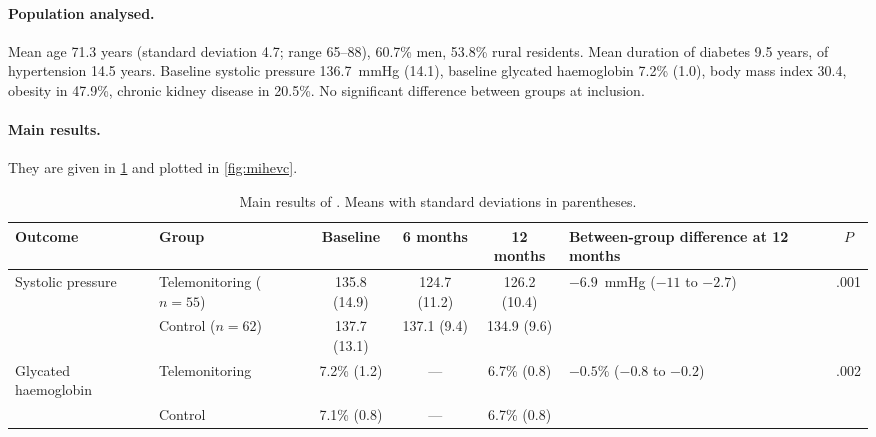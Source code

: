 \documentclass[12pt,a4paper,oneside]{report}
\begin{document}
\paragraph{Population analysed.} Mean age 71.3 years (standard deviation 4.7; range 65--88), 60.7\% men, 53.8\% rural residents. Mean duration of diabetes 9.5 years, of hypertension 14.5 years. Baseline systolic pressure 136.7~mmHg (14.1), baseline glycated haemoglobin 7.2\% (1.0), body mass index 30.4, obesity in 47.9\%, chronic kidney disease in 20.5\%. No significant difference between groups at inclusion.

\paragraph{Main results.} They are given in \cref{tab:mihevc-results} and plotted in \cref{fig:mihevc}.

\begin{table}[htbp]
\centering\footnotesize
\caption{Main results of \textcite{mihevc2025}. Means with standard deviations in parentheses.}\label{tab:mihevc-results}
\begin{tabularx}{\textwidth}{@{}>{\raggedright\arraybackslash}p{2.1cm} >{\raggedright\arraybackslash}p{2.1cm} c c c >{\raggedright\arraybackslash}p{2.6cm} c@{}}
\toprule
\textbf{Outcome} & \textbf{Group} & \textbf{Baseline} & \textbf{6 months} & \textbf{12 months} & \textbf{Between-group difference at 12 months} & \textbf{$P$} \\
\midrule
Systolic pressure & Telemonitoring ($n=55$) & 135.8 (14.9) & 124.7 (11.2) & 126.2 (10.4) & $-6.9$~mmHg ($-11$ to $-2.7$) & .001 \\
                  & Control ($n=62$) & 137.7 (13.1) & 137.1 (9.4) & 134.9 (9.6) & & \\
\addlinespace
Glycated haemoglobin & Telemonitoring & 7.2\% (1.2) & --- & 6.7\% (0.8) & $-0.5\%$ ($-0.8$ to $-0.2$) & .002 \\
                     & Control & 7.1\% (0.8) & --- & 6.7\% (0.8) & & \\
\bottomrule
\end{tabularx}
\end{table}
\end{document}
